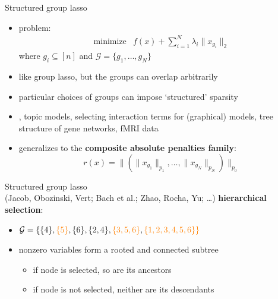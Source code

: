 \documentclass[aspectratio=169,10pt,mathserif]{beamer}
\begin{document}
\begin{frame}{Structured group lasso \\[-0.3em]
	}
\begin{itemize}\itemsep=12pt
\item problem:
\[
\begin{array}{ll}
\mbox{minimize} & f(x) + \sum_{i=1}^N \lambda_i \|x_{g_i}\|_2
\end{array}
\]
where $g_i \subseteq [n]$ and $\mathcal G = \{g_1, \dots, g_N\}$
\item like group lasso, but the groups can overlap arbitrarily
\item particular choices of groups can impose `structured' sparsity
\item \eg, topic models, selecting interaction terms for (graphical) models,
    tree structure of gene networks, fMRI data
\item generalizes to the \textbf{composite absolute penalties family}:
\[
r(x) = \|(\|x_{g_1}\|_{p_1}, \dots, \|x_{g_N}\|_{p_N})\|_{p_0}
\]
\end{itemize}
\end{frame}

\begin{frame}{Structured group lasso \\[-0.3em]
{\footnotesize \textmd{(Jacob, Obozinski, Vert; Bach et al.; Zhao, Rocha, Yu; \dots)}}}
\textbf{hierarchical selection}:
\begin{center}
\end{center}
\begin{itemize}\itemsep=8pt
    \item $\mathcal G = \{ \{4\}, \textcolor{orange}{\{5\}}, \{6\}, \{2,4\},
        \textcolor{orange}{\{3,5,6\}}, \textcolor{orange}{\{1,2,3,4,5,6\} \}}$
\item nonzero variables form a rooted and connected subtree
    \begin{itemize}
        \item if node is selected, so are its ancestors
        \item if node is not selected, neither are its descendants
    \end{itemize}
\end{itemize}
\end{frame}
\end{document}
